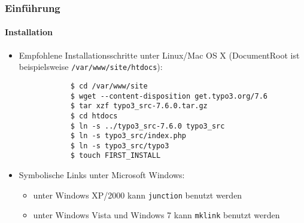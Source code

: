 \begin{frame}[fragile]
	\frametitle{Einführung}
	\framesubtitle{Installation}

	\begin{itemize}
		\item Empfohlene Installationsschritte unter Linux/Mac OS X\newline
			(DocumentRoot ist beispielsweise \texttt{/var/www/site/htdocs}):
		\begin{lstlisting}
			$ cd /var/www/site
			$ wget --content-disposition get.typo3.org/7.6
			$ tar xzf typo3_src-7.6.0.tar.gz
			$ cd htdocs
			$ ln -s ../typo3_src-7.6.0 typo3_src
			$ ln -s typo3_src/index.php
			$ ln -s typo3_src/typo3
			$ touch FIRST_INSTALL
		\end{lstlisting}

		\item Symbolische Links unter Microsoft Windows:

			\begin{itemize}
				\item unter Windows XP/2000 kann \texttt{junction} benutzt werden
				\item unter Windows Vista und Windows 7 kann \texttt{mklink} benutzt werden
			\end{itemize}

	\end{itemize}
\end{frame}

